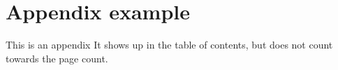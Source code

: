 \chapter{Appendix example}


This is an appendix
It shows up in the table of contents, but does not count towards the page count.
